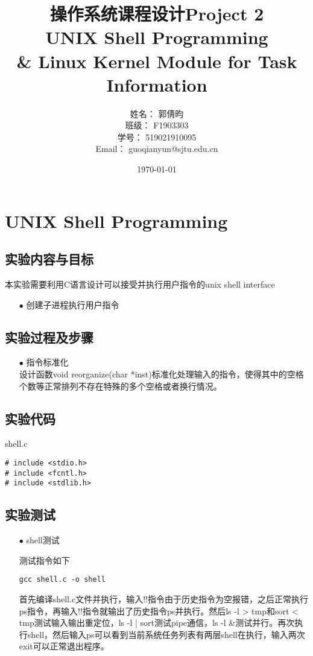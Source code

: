 \documentclass{article}
\title{\textbf{操作系统课程设计Project 2\\UNIX Shell Programming\\ \& Linux Kernel Module for Task Information}} %
\author{姓名： 郭倩昀  
\\班级： F1903303  
\\学号： 519021910095  
\\Email： guoqianyun@sjtu.edu.cn} %
\date{\today} %
\begin{document}
\maketitle %
\tableofcontents
\newpage
\section{UNIX Shell Programming}
\subsection{实验内容与目标}
本实验需要利用C语言设计可以接受并执行用户指令的unix shell interface
\begin{itemize}
\item[$\bullet$]创建子进程执行用户指令
\end{itemize}
\subsection{实验过程及步骤}
\begin{itemize}
\item[$\bullet$]指令标准化\\
设计函数void reorganize(char *inst)标准化处理输入的指令，使得其中的空格个数等正常排列不存在特殊的多个空格或者换行情况。
\end{itemize}
\subsection{实验代码}
\begin{center}
{\ttfamily shell.c}
\end{center}
\begin{lstlisting}[language={[ANSI]C}]
# include <stdio.h>
# include <fcntl.h>
# include <stdlib.h>
\end{lstlisting}
\subsection{实验测试}
\begin{itemize}
\item[$\bullet$]shell测试%

测试指令如下
\begin{lstlisting}[language={[ANSI]C}]
gcc shell.c -o shell
\end{lstlisting}
首先编译shell.c文件并执行，输入!!指令由于历史指令为空报错，之后正常执行ps指令，再输入!!指令就输出了历史指令ps并执行。然后ls -l > tmp和sort < tmp测试输入输出重定位，ls -l | sort测试pipe通信，ls -l \&测试并行。再次执行shell，然后输入ps可以看到当前系统任务列表有两层shell在执行，输入两次exit可以正常退出程序。
\end{itemize}
\end{document}
